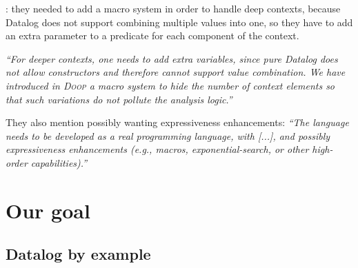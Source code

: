 
\cite{DBLP:conf/datalog/SmaragdakisB10}: they needed to add a macro system in
order to handle deep contexts, because Datalog does not support combining
multiple values into one, so they have to add an extra parameter to a predicate
for each component of the context.

\emph{``For deeper contexts, one needs to add extra variables, since pure
  Datalog does not allow constructors and therefore cannot support value
  combination. We have introduced in \textsc{Doop} a macro system to hide the
  number of context elements so that such variations do not pollute the analysis
  logic.''}

They also mention possibly wanting expressiveness enhancements: \emph{``The
  language needs to be developed as a real programming language, with [...], and
  possibly expressiveness enhancements (e.g., macros, exponential-search, or
  other high-order capabilities).''}


\section{Our goal}



\subsection{Datalog by example}


